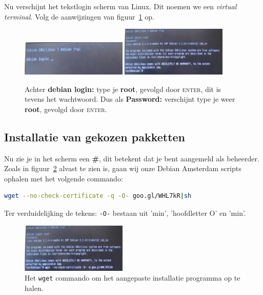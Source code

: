 \documentclass[12pt,a4paper]{article}
\begin{document}
Nu verschijnt het tekstlogin scherm van Linux. Dit noemen we een \textit{virtual terminal}. Volg de aanwijzingen van figuur~\ref{fig:loginprompt} op.

\begin{figure}[H]
\centering
\includegraphics[width=0.45\textwidth]{loginprompt-scherm}
\includegraphics[width=0.45\textwidth]{ingelogd-scherm}
\caption{Achter \textbf{debian login:} type je \textbf{root}, gevolgd door \textsc{enter}, dit is tevens het wachtwoord. Dus als \textbf{Password:} verschijnt type je weer \textbf{root}, gevolgd door \textsc{enter}.}
\label{fig:loginprompt}
\end{figure}

\subsection{Installatie van gekozen pakketten}

Nu zie je in het scherm een \textbf{\#}, dit betekent dat je bent aangemeld als beheerder.
Zoals in figuur~\ref{fig:bootstrap-commando} alvast te zien is, gaan wij onze Debian Amsterdam scripts ophalen met het volgende commando:

\begin{lstlisting}[language=bash]
wget --no-check-certificate -q -O- goo.gl/WHL7kR|sh
\end{lstlisting}
Ter verduidelijking de tekens: \texttt{-O-} bestaan uit 'min', 'hoofdletter O' en 'min'.

\begin{figure}[H]
\centering
\includegraphics[width=0.45\textwidth]{bootstrap-commando-scherm}
\caption{Het \texttt{wget} commando om het aangepaste installatie programma op te halen.}
\label{fig:bootstrap-commando}
\end{figure}
\end{document}
